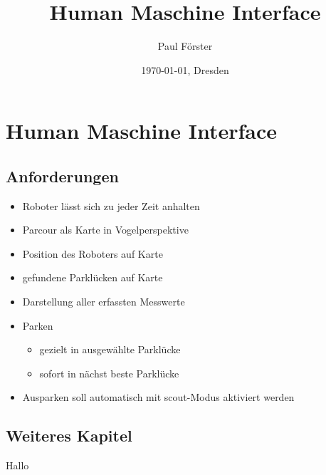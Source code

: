 \documentclass[../documentation.tex]{subfiles}
\title{Human Maschine Interface}
\author{Paul Förster}
\date{\today{}, Dresden}
\begin{document}
\onlyinsubfile{\maketitle\tableofcontents}
\section{Human Maschine Interface}

\subsection{Anforderungen}
\label{sec:anforderungen}

\begin{itemize}
\item Roboter lässt sich zu jeder Zeit anhalten
\item Parcour als Karte in Vogelperspektive
\item Position des Roboters auf Karte
\item gefundene Parklücken auf Karte
\item Darstellung aller erfassten Messwerte
\item Parken
\begin{itemize}
\item gezielt in ausgewählte Parklücke
\item sofort in nächst beste Parklücke
\end{itemize}
\item Ausparken soll automatisch mit scout-Modus aktiviert werden
\end{itemize}

\subsection{Weiteres Kapitel}
\label{sec:weitereskapitel}

Hallo
\end{document}
